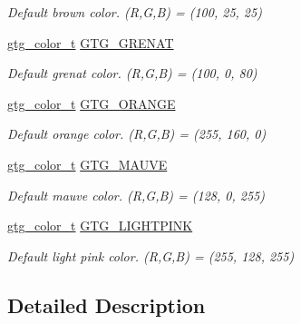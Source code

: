 \begin{DoxyCompactItemize}
\begin{DoxyCompactList}\small\item\em Default brown color. (R,G,B) = (100, 25, 25) \end{DoxyCompactList}\item 
\hyperlink{GTGColor_8h_a7d118edf2d6e2588a0323079259fb0d6}{gtg\-\_\-color\-\_\-t} \hyperlink{group__GTGColor_ga522dceb98e51420b5145113ba0297eba}{G\-T\-G\-\_\-\-G\-R\-E\-N\-A\-T}
\begin{DoxyCompactList}\small\item\em Default grenat color. (R,G,B) = (100, 0, 80) \end{DoxyCompactList}\item 
\hyperlink{GTGColor_8h_a7d118edf2d6e2588a0323079259fb0d6}{gtg\-\_\-color\-\_\-t} \hyperlink{group__GTGColor_ga5ab65b258d884aee7f7510728c3a9c7d}{G\-T\-G\-\_\-\-O\-R\-A\-N\-G\-E}
\begin{DoxyCompactList}\small\item\em Default orange color. (R,G,B) = (255, 160, 0) \end{DoxyCompactList}\item 
\hyperlink{GTGColor_8h_a7d118edf2d6e2588a0323079259fb0d6}{gtg\-\_\-color\-\_\-t} \hyperlink{group__GTGColor_ga4de28f536dd910bf024fc2caa5234cb5}{G\-T\-G\-\_\-\-M\-A\-U\-V\-E}
\begin{DoxyCompactList}\small\item\em Default mauve color. (R,G,B) = (128, 0, 255) \end{DoxyCompactList}\item 
\hyperlink{GTGColor_8h_a7d118edf2d6e2588a0323079259fb0d6}{gtg\-\_\-color\-\_\-t} \hyperlink{group__GTGColor_ga27a569b9d34652d78d38ce7f7cda6794}{G\-T\-G\-\_\-\-L\-I\-G\-H\-T\-P\-I\-N\-K}
\begin{DoxyCompactList}\small\item\em Default light pink color. (R,G,B) = (255, 128, 255) \end{DoxyCompactList}\end{DoxyCompactItemize}


\subsection{Detailed Description}


